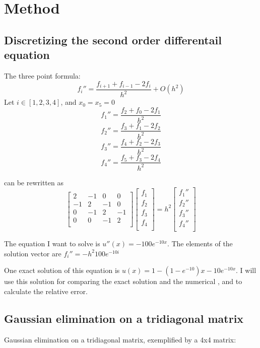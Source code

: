 \documentclass{article}
\begin{document}
\section{Method}
\subsection{Discretizing the second order differentail equation}

The three point formula:
$$
f_i''=\frac{f_{i+1}+f_{i-1}-2f_i}{h^2}+O(h^2)
$$
Let $i \in [1,2,3,4]$, and $x_0=x_5=0$
$$
f_1''=\frac{f_{2}+f_{0}-2f_1}{h^2}
$$
$$
f_2''=\frac{f_{3}+f_{1}-2f_2}{h^2}
$$
$$
f_3''=\frac{f_{4}+f_{2}-2f_3}{h^2}
$$
$$
f_4''=\frac{f_{5}+f_{3}-2f_4}{h^2}
$$

can be rewritten as
$$
\begin{bmatrix}
2 & -1 & 0 & 0 \\
-1 & 2 & -1 & 0 \\
0 & -1 & 2  & -1 \\
0 & 0 & -1 & 2 \\
\end{bmatrix}
\begin{bmatrix}
f_1\\
f_2\\
f_3\\
f_4\\
\end{bmatrix}
=h^2
\begin{bmatrix}
f_1''\\
f_2''\\
f_3''\\
f_4''\\
\end{bmatrix}
$$


The equation I want to solve is $u''(x)=-100e^{-10x}$. The elements of the solution vector are $f_i''=-h^2 100e^{-10i}$

One exact solution of this equation is $u(x)=1-(1-e^{-10})x-10e^{-10x} $. I will use this solution for comparing the exact solution and the numerical , and to calculate the relative error. 

\subsection{Gaussian elimination on a tridiagonal matrix}
Gaussian elimination on a tridiagonal matrix, exemplified by a 4x4 matrix: 
\end{document}
